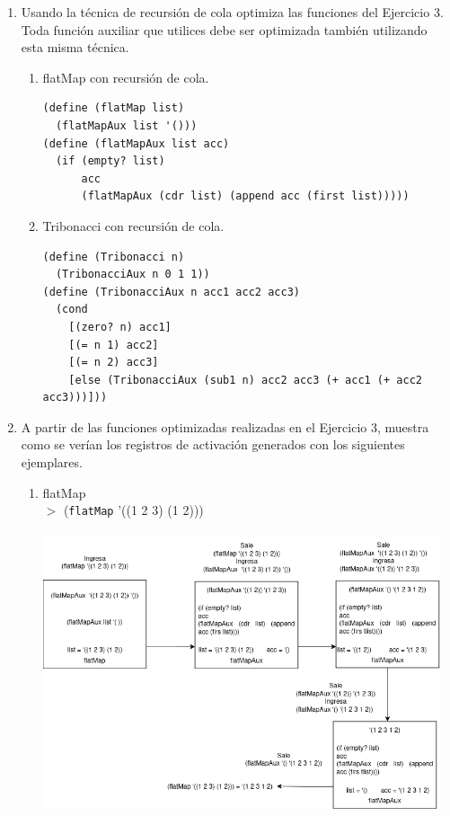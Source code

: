 \documentclass[11pt]{article}
\begin{document}
\begin{enumerate}[leftmargin=0.8cm]
\begin{enumerate}
    \end{enumerate}
    \item Usando la técnica de recursión de cola optimiza las funciones del Ejercicio 3. Toda función auxiliar que utilices debe ser optimizada también utilizando esta misma técnica.\\
    \begin{enumerate}
        \item flatMap con recursión de cola.
        \begin{lstlisting}
(define (flatMap list)
  (flatMapAux list '()))
(define (flatMapAux list acc)
  (if (empty? list)
      acc
      (flatMapAux (cdr list) (append acc (first list)))))
        \end{lstlisting}
        \item Tribonacci con recursión de cola.
        \begin{lstlisting}
(define (Tribonacci n)
  (TribonacciAux n 0 1 1))
(define (TribonacciAux n acc1 acc2 acc3)
  (cond
    [(zero? n) acc1]
    [(= n 1) acc2]
    [(= n 2) acc3]
    [else (TribonacciAux (sub1 n) acc2 acc3 (+ acc1 (+ acc2 acc3)))]))
        \end{lstlisting}
    \end{enumerate}
    \item A partir de las funciones optimizadas realizadas en el Ejercicio 3, muestra como se verían los registros de activación generados con los siguientes ejemplares.
    \begin{enumerate}
        \item flatMap\\
        $>$ (\texttt{flatMap} '((1 2 3) (1 2)))\\\\
        \includegraphics[height = 8cm]{flatmap_cola.png}

\end{enumerate}
\end{enumerate}
\end{document}
